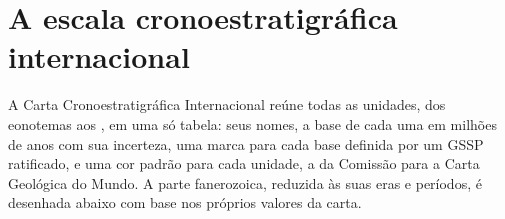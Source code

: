 \section{A escala cronoestratigráfica internacional}\label{sec:b1:stratigraphic-scale:chart}

A Carta Cronoestratigráfica Internacional reúne todas as unidades, dos eonotemas aos ,
em uma só tabela: seus nomes, a base de cada uma em milhões de anos com sua incerteza, uma marca
para cada base definida por um GSSP ratificado, e uma cor padrão para cada unidade, a da
Comissão para a Carta Geológica do Mundo. A parte fanerozoica, reduzida às suas eras e
períodos, é desenhada abaixo com base nos próprios valores da carta.

